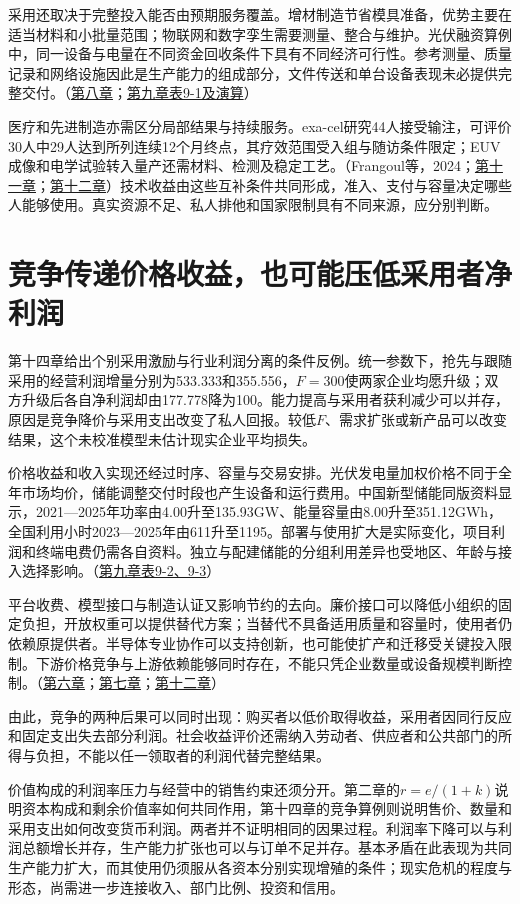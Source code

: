 \documentclass[UTF8,fontset=windows,12pt,a4paper,oneside,openany]{ctexbook}
\begin{document}
采用还取决于完整投入能否由预期服务覆盖。增材制造节省模具准备，优势主要在适当材料和小批量范围；物联网和数字孪生需要测量、整合与维护。光伏融资算例中，同一设备与电量在不同资金回收条件下具有不同经济可行性。参考测量、质量记录和网络设施因此是生产能力的组成部分，文件传送和单台设备表现未必提供完整交付。（\hyperref[ch:8]{第八章}；\hyperref[ch:9]{第九章表9-1及演算}）

医疗和先进制造亦需区分局部结果与持续服务。exa-cel研究44人接受输注，可评价30人中29人达到所列连续12个月终点，其疗效范围受入组与随访条件限定；EUV成像和电学试验转入量产还需材料、检测及稳定工艺。（Frangoul等，2024；\hyperref[ch:11]{第十一章}；\hyperref[ch:12]{第十二章}）技术收益由这些互补条件共同形成，准入、支付与容量决定哪些人能够使用。真实资源不足、私人排他和国家限制具有不同来源，应分别判断。

\section{竞争传递价格收益，也可能压低采用者净利润}

第十四章给出个别采用激励与行业利润分离的条件反例。统一参数下，抢先与跟随采用的经营利润增量分别为533.333和355.556，$F=300$使两家企业均愿升级；双方升级后各自净利润却由177.778降为100。能力提高与采用者获利减少可以并存，原因是竞争降价与采用支出改变了私人回报。较低$F$、需求扩张或新产品可以改变结果，这个未校准模型未估计现实企业平均损失。

价格收益和收入实现还经过时序、容量与交易安排。光伏发电量加权价格不同于全年市场均价，储能调整交付时段也产生设备和运行费用。中国新型储能同版资料显示，2021—2025年功率由4.00升至135.93GW、能量容量由8.00升至351.12GWh，全国利用小时2023—2025年由611升至1195。部署与使用扩大是实际变化，项目利润和终端电费仍需各自资料。独立与配建储能的分组利用差异也受地区、年龄与接入选择影响。（\hyperref[ch:9]{第九章表9-2、9-3}）

平台收费、模型接口与制造认证又影响节约的去向。廉价接口可以降低小组织的固定负担，开放权重可以提供替代方案；当替代不具备适用质量和容量时，使用者仍依赖原提供者。半导体专业协作可以支持创新，也可能使扩产和迁移受关键投入限制。下游价格竞争与上游依赖能够同时存在，不能只凭企业数量或设备规模判断控制。（\hyperref[ch:6]{第六章}；\hyperref[ch:7]{第七章}；\hyperref[ch:12]{第十二章}）

由此，竞争的两种后果可以同时出现：购买者以低价取得收益，采用者因同行反应和固定支出失去部分利润。社会收益评价还需纳入劳动者、供应者和公共部门的所得与负担，不能以任一领取者的利润代替完整结果。

价值构成的利润率压力与经营中的销售约束还须分开。第二章的$r=e/(1+k)$说明资本构成和剩余价值率如何共同作用，第十四章的竞争算例则说明售价、数量和采用支出如何改变货币利润。两者并不证明相同的因果过程。利润率下降可以与利润总额增长并存，生产能力扩张也可以与订单不足并存。基本矛盾在此表现为共同生产能力扩大，而其使用仍须服从各资本分别实现增殖的条件；现实危机的程度与形态，尚需进一步连接收入、部门比例、投资和信用。
\end{document}

